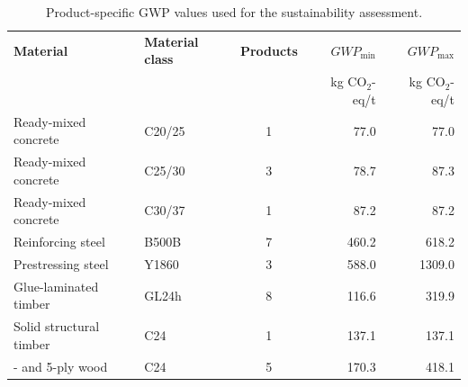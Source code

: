 \begin{table}[h]
    \centering
    \begingroup
    \scriptsize
    \caption{Product-specific GWP values used for the sustainability assessment.}
    \label{tab:product_specific_gwp_values}
    \setlength{\tabcolsep}{3pt}
    \renewcommand{\arraystretch}{1.12}
    \begin{tabularx}{\textwidth}{@{}
        >{\raggedright\arraybackslash}X
        |>{\raggedright\arraybackslash}X
        |c|r|r@{}}
    \hline
    \textbf{Material} &
    \textbf{Material class} &
    \textbf{Products} &
    \textbf{$GWP_{\min}$} &
    \textbf{$GWP_{\max}$} \\
    &
    &
    &
    kg CO$_2$-eq/t &
    kg CO$_2$-eq/t \\
    \hline

    Ready-mixed concrete & C20/25 & 1  & 77.0   & 77.0 \\
    Ready-mixed concrete & C25/30 & 3  & 78.7   & 87.3 \\
    Ready-mixed concrete & C30/37 & 1  & 87.2   & 87.2 \\
    Reinforcing steel    & B500B  & 7 & 460.2  & 618.2 \\
    Prestressing steel   & Y1860  & 3  & 588.0  & 1309.0 \\
    Glue-laminated timber& GL24h  & 8 & 116.6 & 319.9 \\
    Solid structural timber & C24 & 1 & 137.1   & 137.1 \\
    3- and 5-ply wood    & C24    & 5 & 170.3  & 418.1 \\
    \hline
    \end{tabularx}
    \endgroup
    
\end{table}



